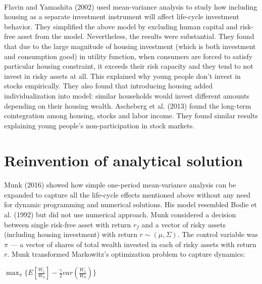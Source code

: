 \paragraph*{}Flavin and Yamashita (2002) used mean-variance analysis to study how including housing as a separate investment instrument will affect life-cycle investment behavior. They simplified the above model by excluding human capital and risk-free asset from the model. Nevertheless, the results were substantial. They found that due to the large magnitude of housing investment (which is both investment and consumption good) in utility function, when consumers are forced to satisfy particular housing constraint, it exceeds their risk capacity and they tend to not invest in risky assets at all. This explained why young people don't invest in stocks empirically. They also found that introducing housing added individualization into model: similar households would invest different amounts depending on their housing wealth. Ascheberg et al. (2013) found the long-term cointegration among housing, stocks and labor income. They found similar results explaining young people's non-participation in stock markets. 



\section{Reinvention of analytical solution}


\paragraph*{}Munk (2016) showed how simple one-period mean-variance analysis can be expanded to capture all the life-cycle effects mentioned above without any need for dynamic programming and numerical solutions. His model resembled Bodie et al. (1992) but did not use numerical approach. Munk considered a decision between single risk-free asset with return $r_f$ and a vector of risky assets (including housing investment) with return $r \sim (\mu, \Sigma)$. The control variable was $\pi$ --- a vector of shares of total wealth invested in each of risky assets with return $r$. Munk transformed Markowitz's optimization problem to capture dynamics:


\begin{center}
	$ \displaystyle\max_{\pi} \{ E[\frac{W_1}{W_0}] - \frac{\gamma}{2} var(\frac{W_1}{W_0}) \} $
\end{center}

